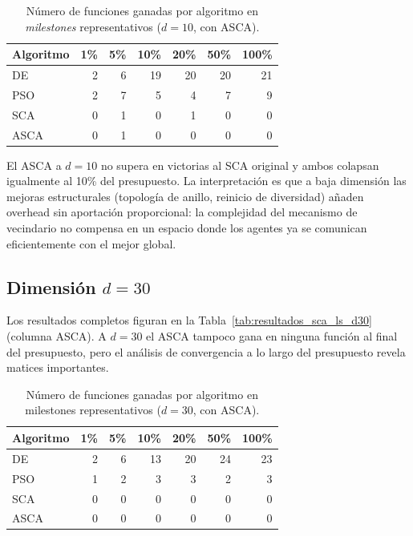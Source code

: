 \documentclass[12pt,a4paper]{article}
\begin{document}
\begin{table}[H]
\centering
\caption{Número de funciones ganadas por algoritmo en \textit{milestones} representativos ($d=10$, con ASCA).}
\label{tab:resumen_victorias_asca_d10}
\renewcommand{\arraystretch}{1.2}
\begin{tabular}{lrrrrrr}
\toprule
\textbf{Algoritmo} & \textbf{1\%} & \textbf{5\%} & \textbf{10\%} & \textbf{20\%} & \textbf{50\%} & \textbf{100\%} \\
\midrule
DE      &  2 &  6 & 19 & 20 & 20 & 21 \\
PSO     &  2 &  7 &  5 &  4 &  7 &  9 \\
SCA     &  0 &  1 &  0 &  1 &  0 &  0 \\
ASCA    &  0 &  1 &  0 &  0 &  0 &  0 \\
\bottomrule
\end{tabular}
\end{table}

El ASCA a $d=10$ no supera en victorias al SCA original y ambos colapsan igualmente al 10\% del presupuesto. La interpretación es que a baja dimensión las mejoras estructurales (topología de anillo, reinicio de diversidad) añaden overhead sin aportación proporcional: la complejidad del mecanismo de vecindario no compensa en un espacio donde los agentes ya se comunican eficientemente con el mejor global.

\subsection{Dimensión $d = 30$}

Los resultados completos figuran en la Tabla~\ref{tab:resultados_sca_ls_d30} (columna ASCA). A $d=30$ el ASCA tampoco gana en ninguna función al final del presupuesto, pero el análisis de convergencia a lo largo del presupuesto revela matices importantes.

\begin{table}[H]
\centering
\caption{Número de funciones ganadas por algoritmo en milestones representativos ($d=30$, con ASCA).}
\label{tab:resumen_victorias_asca_d30}
\renewcommand{\arraystretch}{1.2}
\begin{tabular}{lrrrrrr}
\toprule
\textbf{Algoritmo} & \textbf{1\%} & \textbf{5\%} & \textbf{10\%} & \textbf{20\%} & \textbf{50\%} & \textbf{100\%} \\
\midrule
DE      &  2 &  6 & 13 & 20 & 24 & 23 \\
PSO     &  1 &  2 &  3 &  3 &  2 &  3 \\
SCA     &  0 &  0 &  0 &  0 &  0 &  0 \\
ASCA    &  0 &  0 &  0 &  0 &  0 &  0 \\
\bottomrule
\end{tabular}
\end{table}
\end{document}
